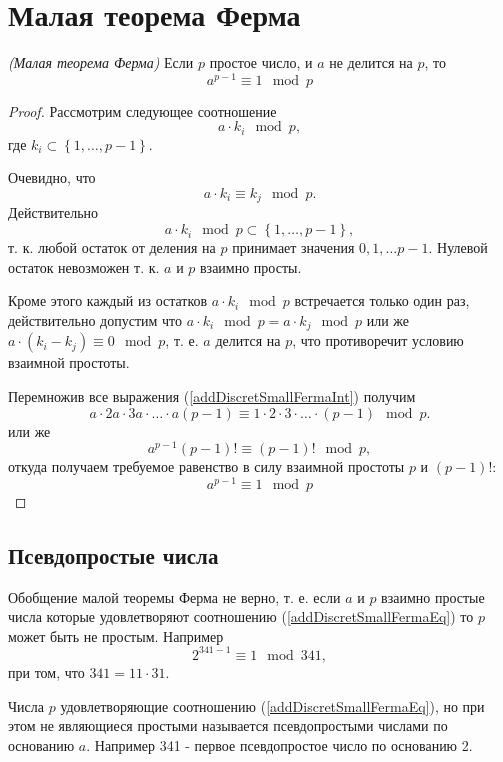 \section{Малая теорема Ферма}

\begin{theorem}
\emph{(Малая теорема Ферма)}
\label{addDiscretSmallFerma}
Если $p$ простое число, и $a$ не делится на $p$, то 
\begin{equation}
a^{p-1} \equiv 1 \mod{p}
\label{addDiscretSmallFermaEq}
\end{equation}
\end{theorem}

\begin{proof}
Рассмотрим следующее соотношение
\[
a \cdot k_i \mod{p},
\]
где $k_i \subset \left\{1, \dots, p - 1\right\}$.

Очевидно, что 
\begin{equation}
a \cdot k_i \equiv k_j \mod{p}.
\label{addDiscretSmallFermaInt}
\end{equation}
Действительно
\[
a \cdot k_i \mod{p} \subset \left\{1, \dots, p - 1\right\},
\]
т. к. любой остаток от деления на $p$ принимает значения $0, 1, \dots
p-1$. Нулевой остаток невозможен т. к. $a$ и $p$ взаимно просты.

Кроме этого каждый из остатков $a \cdot k_i \mod{p}$ встречается
только один раз, действительно допустим что $a \cdot k_i \mod{p} = a
\cdot k_j \mod{p}$ или же $a \cdot \left( k_i - k_j \right ) \equiv 0
\mod{p}$, т. е. $a$ делится на $p$, что противоречит условию взаимной
простоты. 

Перемножив все выражения (\ref{addDiscretSmallFermaInt}) получим
\[
a \cdot 2a \cdot 3a \cdot \dots \cdot a\left(p - 1\right) 
\equiv 1 \cdot 2 \cdot 3 \cdot \dots \cdot \left(p - 1\right) \mod{p}.
\]
или же
\[
a^{p-1} \left(p - 1\right)! \equiv \left(p - 1\right)! \mod{p},
\]
откуда получаем требуемое равенство в силу взаимной простоты $p$ и
$\left(p-1\right)!$:
\[
a^{p-1} \equiv 1 \mod{p}
\]
\end{proof}

\subsection{Псевдопростые числа}
Обобщение малой теоремы Ферма не верно, т. е.  если $a$ и $p$ взаимно
простые числа которые удовлетворяют соотношению
(\ref{addDiscretSmallFermaEq}) то $p$ может быть не простым. Например
\[
2 ^ {341 - 1} \equiv 1 \mod{ 341 },
\] 
при том, что $341 = 11 \cdot 31$.

Числа $p$ удовлетворяющие соотношению (\ref{addDiscretSmallFermaEq}),
но при этом не являющиеся простыми называется псевдопростыми числами
по основанию $a$. Например 341 - первое псевдопростое число по
основанию 2.
